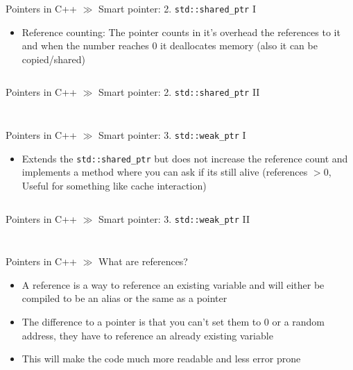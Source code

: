 \documentclass[10pt]{beamer}
\begin{document}
\begin{frame}{Pointers in C++ $\gg$ Smart pointer: 2.  \texttt{std::shared_ptr} I}
\begin{itemize}
	\item Reference counting: The pointer counts in it's overhead the references to it and when the number reaches $0$ it deallocates memory (also it can be copied/shared)
	\inputminted[bgcolor=lightGreyCustom,fontsize=\scriptsize,lastline=17]{cpp}{./resources/shared_ptr.cpp}
\end{itemize}
\end{frame}

\begin{frame}{Pointers in C++ $\gg$ Smart pointer: 2.  \texttt{std::shared_ptr} II}
\begin{itemize}
	\inputminted[bgcolor=lightGreyCustom,fontsize=\scriptsize,firstline=18]{cpp}{./resources/shared_ptr.cpp}
	\vspace{-9mm}
	\inputminted[bgcolor=lightGreyCustom,fontsize=\scriptsize ]{sh}{./resources/build_shared_ptr.sh}
\end{itemize}
\end{frame}

\begin{frame}{Pointers in C++ $\gg$ Smart pointer: 3.  \texttt{std::weak_ptr} I}
\begin{itemize}
	\item Extends the \texttt{std::shared_ptr} but does not increase the reference count and implements a method where you can ask if its still alive (references $> 0$, Useful for something like cache interaction)
	\inputminted[bgcolor=lightGreyCustom,fontsize=\scriptsize,lastline=17]{cpp}{./resources/weak_ptr.cpp}
\end{itemize}
\end{frame}

\begin{frame}{Pointers in C++ $\gg$ Smart pointer: 3.  \texttt{std::weak_ptr} II}
\begin{itemize}
	\inputminted[bgcolor=lightGreyCustom,fontsize=\scriptsize,firstline=18]{cpp}{./resources/weak_ptr.cpp}
	\vspace{-9mm}
	\inputminted[bgcolor=lightGreyCustom,fontsize=\scriptsize ]{sh}{./resources/build_weak_ptr.sh}
\end{itemize}
\end{frame}

\begin{frame}{Pointers in C++ $\gg$ What are references?}
\begin{itemize}
	\item A reference is a way to reference an existing variable and will either be compiled to be an alias or the same as a pointer
	\item The difference to a pointer is that you can't set them to 0 or a random address, they have to reference an already existing variable
	\item This will make the code much more readable and less error prone
	\inputminted[bgcolor=lightGreyCustom,fontsize=\scriptsize ]{cpp}{./resources/references_example.cpp}
\end{itemize}
\end{frame}
\end{document}
